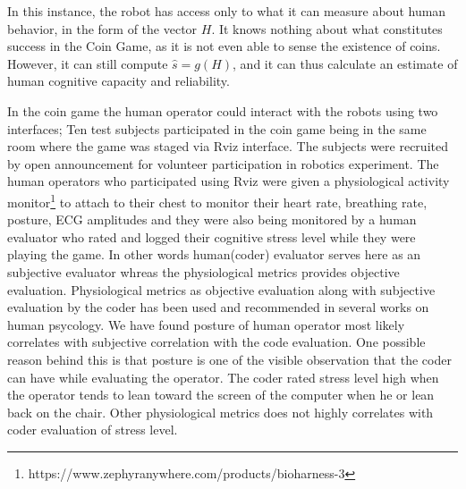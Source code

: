 \documentclass{sig-alternate}
\begin{document}
In this instance, the robot has access only to what it can measure
about human behavior, in the form of the vector $H$.  It knows nothing
about what constitutes success in the Coin Game, as it is not even
able to sense the existence of coins.  However, it can still compute
$\hat{s} = g(H)$, and it can thus calculate an estimate of human
cognitive capacity and reliability.

In the coin game the human operator could interact with the robots using two interfaces; 
Ten test subjects participated in the coin game being in the same room where the game was staged via Rviz interface. The subjects were recruited by open announcement for volunteer participation in robotics experiment. 
The human operators who participated using Rviz were given a physiological activity monitor\footnote{https://www.zephyranywhere.com/products/bioharness-3} to attach to their chest to monitor their heart rate, breathing rate, posture, ECG amplitudes and they were also being monitored by a human evaluator who rated and logged their cognitive stress level while they were playing the game. In other words human(coder) evaluator serves here as an subjective evaluator whreas the physiological metrics provides objective evaluation. Physiological metrics as objective evaluation along with subjective evaluation by the coder has been used and recommended in several works on human psycology\cite{Brookings1996361, Roscoe1992259}. We have found posture of human operator most likely correlates with subjective correlation with the code evaluation. One possible reason behind this is that posture is one of the visible observation that the coder can have while evaluating the operator. The coder rated stress level high when the operator tends to lean toward the screen of the computer when he or lean back on the chair. Other physiological metrics does not highly correlates with coder evaluation of stress level.
\end{document}
